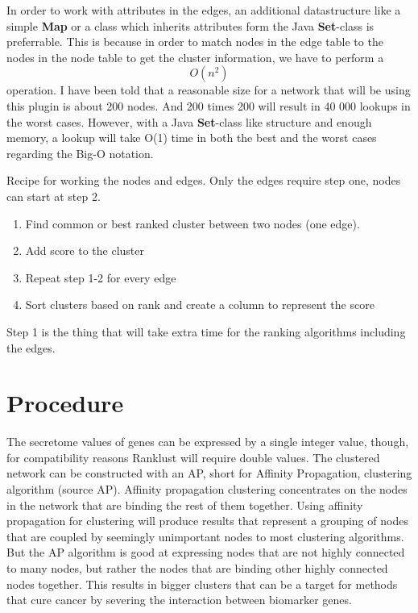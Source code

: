 \documentclass[UKenglish]{ifimaster}
\begin{document}
In order to work with attributes in the edges, an additional datastructure like
a simple \textbf{Map} or a class which inherits attributes form the Java
\textbf{Set}-class\cite{java-set} is preferrable. This is because in order to
match nodes in the edge table to the nodes in the node table to get the cluster
information, we have to perform a \begin{equation} O(n^2) \end{equation}
operation. I have been told that a reasonable size for a network that will
be using this plugin is about 200 nodes. And 200 times 200 will result in 40
000 lookups in the worst cases. However, with a Java \textbf{Set}-class like
structure and enough memory, a lookup will take O(1) time in both the best and
the worst cases regarding the Big-O notation\cite{big-o}.

Recipe for working the nodes and edges. Only the edges require step one, nodes
can start at step 2.
\begin{enumerate}
    \item Find common or best ranked cluster between two nodes (one edge).
    \item Add score to the cluster
    \item Repeat step 1-2 for every edge
    \item Sort clusters based on rank and create a column to represent the score
\end{enumerate}

Step 1 is the thing that will take extra time for the ranking algorithms
including the edges.



\part{Procedure}
The secretome values of genes can be expressed by a single integer value,
though, for compatibility reasons Ranklust will require double values. The
clustered network can be constructed with an AP, short for Affinity Propagation,
clustering algorithm (source AP). Affinity propagation clustering concentrates
on the nodes in the network that are binding the rest of them together. Using
affinity propagation for clustering will produce results that represent a
grouping of nodes that are coupled by seemingly unimportant nodes to most
clustering algorithms. But the AP algorithm is good at expressing nodes that are
not highly connected to many nodes, but rather the nodes that are binding other
highly connected nodes together. This results in bigger clusters that can be a
target for methods that cure cancer by severing the interaction between
biomarker genes.
\end{document}
